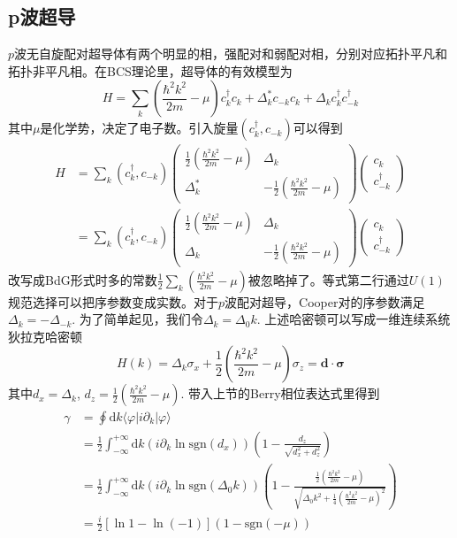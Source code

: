 \documentclass{article}
\numberwithin{equation}{subsection}
\newcommand{\md}{\mathrm{d}}
\newcommand{\sgn}{\mathrm{sgn}}
\newcommand{\msigma}{\bm{\sigma}}
\begin{document}
\subsection{p波超导}
$p$波无自旋配对超导体有两个明显的相，强配对和弱配对相，分别对应拓扑平凡和拓扑非平凡相。在BCS理论里，超导体的有效模型为
\begin{equation}
    H=\sum_{k}(\frac{\hbar^2 k^2}{2m}-\mu)c_k^\dagger c_k+\Delta_k^* c_{-k}c_{k}+\Delta_k c_{k}^\dagger c_{-k}^\dagger
\end{equation}
其中$\mu$是化学势，决定了电子数。引入旋量$(c_k^\dagger,c_{-k})$可以得到
\begin{equation}
    \begin{split}
        H&=\sum_{k}(c_k^\dagger,c_{-k})\begin{pmatrix}
            \frac{1}{2}(\frac{\hbar^2 k^2}{2m}-\mu)&\Delta_k\\
            \Delta_k^*&-\frac{1}{2}(\frac{\hbar^2k^2}{2m}-\mu)
        \end{pmatrix}\begin{pmatrix}
            c_k\\
            c_{-k}^\dagger
        \end{pmatrix}\\
        &=\sum_{k}(c_k^\dagger,c_{-k})\begin{pmatrix}
            \frac{1}{2}(\frac{\hbar^2 k^2}{2m}-\mu)&\Delta_k\\
            \Delta_k&-\frac{1}{2}(\frac{\hbar^2k^2}{2m}-\mu)
        \end{pmatrix}\begin{pmatrix}
            c_k\\
            c_{-k}^\dagger
        \end{pmatrix}
    \end{split}
\end{equation}
改写成BdG形式时多的常数$\frac{1}{2}\sum_{k}(\frac{\hbar^2 k^2}{2m}-\mu)$被忽略掉了。等式第二行通过$U(1)$规范选择可以把序参数变成实数。对于$p$波配对超导，Cooper对的序参数满足$\Delta_k=-\Delta_{-k}$. 为了简单起见，我们令$\Delta_k=\Delta_0 k$. 上述哈密顿可以写成一维连续系统狄拉克哈密顿
\begin{equation}
    H(k)=\Delta_k\sigma_x+\frac{1}{2}(\frac{\hbar^2 k^2}{2m}-\mu)\sigma_z=\mathbf{d}\cdot\msigma
\end{equation}
其中$d_x=\Delta_k$, $d_z=\frac{1}{2}(\frac{\hbar^2 k^2}{2m}-\mu)$. 带入上节的Berry相位表达式里得到
\begin{equation}
    \begin{split}
        \gamma&=\oint\md k\langle\varphi|i\partial_k|\varphi\rangle\\
        &=\frac{1}{2}\int_{-\infty}^{+\infty}\md k(i\partial_k\ln\sgn(d_x))(1-\frac{d_z}{\sqrt{d_x^2+d_z^2}})\\
        &=\frac{1}{2}\int_{-\infty}^{+\infty}\md k(i\partial_k\ln\sgn(\Delta_0 k))(1-\frac{\frac{1}{2}(\frac{\hbar^2 k^2}{2m}-\mu)}{\sqrt{\Delta_0k^2+\frac{1}{4}(\frac{\hbar^2 k^2}{2m}-\mu)^2}})\\
        &=\frac{i}{2}[\ln1-\ln(-1)](1-\sgn(-\mu))
    \end{split}
\end{equation}
\end{document}
